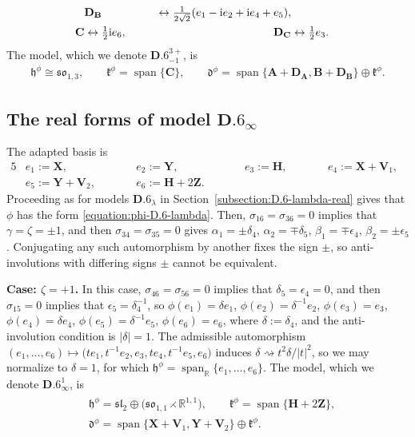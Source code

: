 \documentclass[10pt,a4paper]{amsart}
\newlength{\caseIndent}
\DeclareMathOperator{\spanOperator}{span}
\newcommand{\Span}[1]{\spanOperator\{{#1}\}}
\newcommand{\bbR}{\mathbb{R}}
\newcommand{\mbA}{\mathbf{A}}
\newcommand{\mbB}{\mathbf{B}}
\newcommand{\mbC}{\mathbf{C}}
\newcommand{\mbD}{\mathbf{D}}
\newcommand{\mbH}{\mathbf{H}}
\newcommand{\mbV}{\mathbf{V}}
\newcommand{\mbX}{\mathbf{X}}
\newcommand{\mbY}{\mathbf{Y}}
\newcommand{\mbZ}{\mathbf{Z}}
\newcommand{\mfd} {\mathfrak{d}}
\newcommand{\mfh} {\mathfrak{h}}
\newcommand{\mfk} {\mathfrak{k}}
\newcommand{\mfsl} {\mathfrak{sl}}
\newcommand{\mfso} {\mathfrak{so}}
\numberwithin{equation}{section}
\begin{document}
\begin{itemize}[leftmargin=\caseIndent]
\begin{alignat*}{4}
			&\mbD_{\mbB} &\leftrightarrow \tfrac{1}{2 \sqrt{2}} (e_1 - {\rm i} e_2 + {\rm i} e_4 + e_5) , \\
			 \mbC &\leftrightarrow \tfrac{1}{2} {\rm i} e_6 , \qquad
			&\mbD_{\mbC} &\leftrightarrow \tfrac{1}{2} e_3 .
		\end{alignat*}
		The model, which we denote $\mathbf{D.6}_{-1}^{3+}$, is
		\begin{gather*}
			\boxed{
 \mfh^{\phi} \cong \mfso_{1, 3} , \qquad
				\mfk^{\phi} = \Span{\mbC} , \qquad
				\mfd^{\phi} = \Span{\mbA + \mbD_{\mbA}, \mbB + \mbD_{\mbB}} \oplus \mfk^{\phi} .
			}
		\end{gather*}
\end{itemize}

\subsection[The real forms of model $\mathbf{D.6}_{\infty}$]{The real forms of model $\boldsymbol{\mathbf{D.6}_{\infty}}$}\label{subsection:D.6-infty-real}

The adapted basis is
\begin{alignat*}{5}
& e_1 := \mbX, \qquad && e_2 := \mbY, \qquad && e_3 := \mbH, \qquad && e_4 := \mbX + \mbV_1, & \\
& e_5 := \mbY + \mbV_2, \qquad && e_6 := \mbH + 2 \mbZ . \qquad && && &
\end{alignat*}
Proceeding as for models $\mathbf{D.6}_{\lambda}$ in Section~\ref{subsection:D.6-lambda-real} gives that $\phi$ has the form \eqref{equation:phi-D.6-lambda}. Then, $\sigma_{16} = \sigma_{36} = 0$ implies that $\gamma = \zeta = \pm 1$, and then $\sigma_{34} = \sigma_{35} = 0$ gives $\alpha_1 = \pm \delta_4$, $\alpha_2 = \mp \delta_5$, $\beta_1 = \mp \epsilon_4$, $\beta_2 = \pm \epsilon_5$. Conjugating any such automorphism by another fixes the sign $\pm$, so anti-involutions with differing signs $\pm$ cannot be equivalent.

\smallskip
\noindent \textbf{Case: $\zeta = + 1$.} In this case, $\sigma_{46} = \sigma_{56} = 0$ implies that $\delta_5 = \epsilon_4 = 0$, and then $\sigma_{15} = 0$ implies that $\epsilon_5 = \delta_4^{-1}$, so $\phi(e_1) = \delta e_1$, $\phi(e_2) = \delta^{-1} e_2$, $\phi(e_3) = e_3$, $\phi(e_4) = \delta e_4$, $\phi(e_5) = \delta^{-1} e_5$, $\phi(e_6) = e_6$, where $\delta := \delta_4$, and the anti-involution condition is $|\delta| = 1$. The admissible automorphism $(e_1, \ldots, e_6) \mapsto \big(t e_1, t^{-1} e_2, e_3, t e_4, t^{-1} e_5, e_6\big)$ induces $\delta \rightsquigarrow t^2 \delta / |t|^2$, so we may normalize to $\delta = 1$, for which $\mfh^{\phi} = \spanOperator_{\bbR}\{e_1, \ldots, e_6\}$. The model, which we denote $\mathbf{D.6}_{\infty}^1$, is
\begin{gather*}
	\boxed{\begin{split}
		&\mfh^{\phi} = \mfsl_2 \oplus \big(\mfso_{1, 1} \rightthreetimes \bbR^{1, 1}\big) , \qquad
		\mfk^{\phi} = \Span{\mbH + 2 \mbZ} , \\
	&	\mfd^{\phi} = \Span{\mbX + \mbV_1, \mbY + \mbV_2} \oplus \mfk^{\phi} .
	\end{split}}
\end{gather*}
\end{document}

